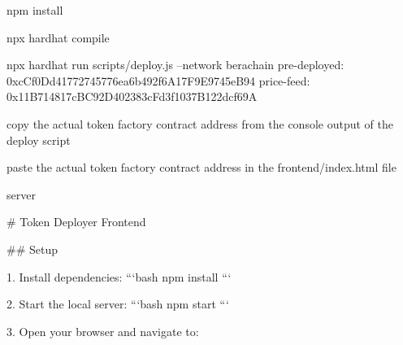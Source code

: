 npm install

npx hardhat compile

npx hardhat run scripts/deploy.js --network berachain
    pre-deployed: 0xcCf0Dd41772745776ea6b492f6A17F9E9745eB94
    price-feed: 0x11B714817cBC92D402383cFd3f1037B122dcf69A

copy the actual token factory contract address from the console output of the deploy script

paste the actual token factory contract address in the frontend/index.html file




server

# Token Deployer Frontend

## Setup

1. Install dependencies:
```bash
npm install
```

2. Start the local server:
```bash
npm start
```

3. Open your browser and navigate to: 
